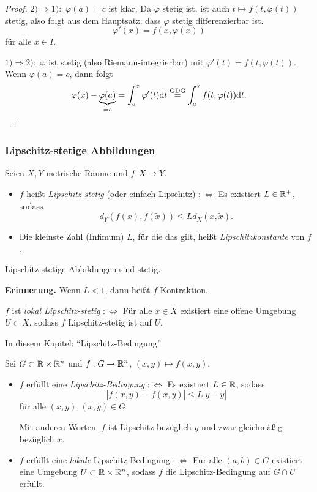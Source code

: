 \begin{proof}
  $2) \Rightarrow 1):$ $\varphi(a) = c$ ist klar. Da $\varphi$ stetig ist, ist
  auch $t \mapsto f(t,\varphi(t))$ stetig, also folgt aus dem Hauptsatz, dass
  $\varphi$ stetig differenzierbar ist.
  \[ \varphi'(x) = f(x,\varphi(x)) \]
  für alle $x \in I$.

  $1) \Rightarrow 2):$ $\varphi$ ist stetig (also Riemann-integrierbar) mit
  $\varphi'(t) = f(t,\varphi(t))$. Wenn $\varphi(a) = c$, dann folgt
  \[ \varphi(x) - \underbrace{\varphi(a)}_{=c}
    = \int_a^x \varphi'(t) \mathrm{d} t
    \overset{\text{GDG}}{=} \int_a^x f(t,\varphi(t)) \mathrm{d} t.
    \qedhere \]
\end{proof}

\subsubsection{Lipschitz-stetige Abbildungen}
Seien $X,Y$ metrische Räume und $f:X \to Y$.
\begin{itemize}
\item $f$ heißt \emph{Lipschitz-stetig} (oder einfach Lipschitz)
  $:\Leftrightarrow$ Es existiert $L \in \mathbb{R}^+$, sodass
  \[ d_Y( f(x), f(\tilde{x})) \le L d_X(x,\tilde{x}). \]
  \item Die kleinste Zahl (Infimum) $L$, für die das gilt, heißt
    \emph{Lipschitzkonstante} von $f$.
\end{itemize}

\begin{rmrk}
  Lipschitz-stetige Abbildungen sind stetig.
\end{rmrk}

\textbf{Erinnerung.} Wenn $L < 1$, dann heißt $f$ Kontraktion.

$f$ ist \emph{lokal Lipschitz-stetig} $:\Leftrightarrow$ Für alle $x \in X$
existiert eine offene Umgebung $U \subset X$, sodass $f$ Lipschitz-stetig ist
auf $U$.

In diesem Kapitel: ``Lipschitz-Bedingung''

Sei $G \subset \mathbb{R} \times \mathbb{R}^n$ und $f:G \to \mathbb{R}^n$, $(x,y) \mapsto
f(x,y)$.
\begin{itemize}
\item $f$ erfüllt eine \emph{Lipschitz-Bedingung} $:\Leftrightarrow$ Es
  existiert $L \in \mathbb{R}$, sodass
  \[ | f(x,y) - f(x,\tilde{y}) | \le L |y-\tilde{y}| \]
  für alle $(x,y), (x,\tilde{y}) \in G$.

  Mit anderen Worten: $f$ ist Lipschitz bezüglich $y$ und zwar gleichmäßig
  bezüglich $x$.
\item $f$ erfüllt eine \emph{lokale} Lipschitz-Bedingung $:\Leftrightarrow$ Für
  alle $(a,b) \in G$ existiert eine Umgebung $U \subset \mathbb{R} \times \mathbb{R}^n$,
  sodass $f$ die Lipschitz-Bedingung auf $G \cap U$ erfüllt.
\end{itemize}


